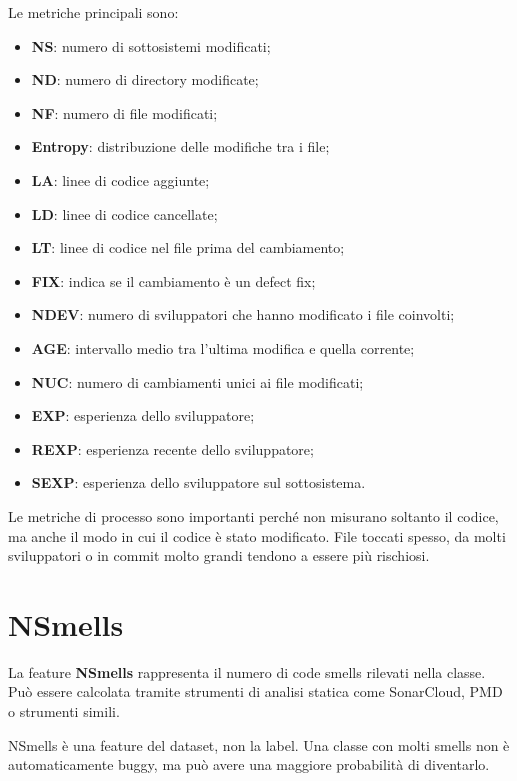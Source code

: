 Le metriche principali sono:

\begin{itemize}
    \item \textbf{NS}: numero di sottosistemi modificati;
    \item \textbf{ND}: numero di directory modificate;
    \item \textbf{NF}: numero di file modificati;
    \item \textbf{Entropy}: distribuzione delle modifiche tra i file;
    \item \textbf{LA}: linee di codice aggiunte;
    \item \textbf{LD}: linee di codice cancellate;
    \item \textbf{LT}: linee di codice nel file prima del cambiamento;
    \item \textbf{FIX}: indica se il cambiamento è un defect fix;
    \item \textbf{NDEV}: numero di sviluppatori che hanno modificato i file coinvolti;
    \item \textbf{AGE}: intervallo medio tra l'ultima modifica e quella corrente;
    \item \textbf{NUC}: numero di cambiamenti unici ai file modificati;
    \item \textbf{EXP}: esperienza dello sviluppatore;
    \item \textbf{REXP}: esperienza recente dello sviluppatore;
    \item \textbf{SEXP}: esperienza dello sviluppatore sul sottosistema.
\end{itemize}

\begin{notaprof}
Le metriche di processo sono importanti perché non misurano soltanto il codice, ma anche il modo in cui il codice è stato modificato. File toccati spesso, da molti sviluppatori o in commit molto grandi tendono a essere più rischiosi.
\end{notaprof}

\section{NSmells}

La feature \textbf{NSmells} rappresenta il numero di code smells rilevati nella classe. Può essere calcolata tramite strumenti di analisi statica come SonarCloud, PMD o strumenti simili.

\begin{notaprof}
NSmells è una feature del dataset, non la label. Una classe con molti smells non è automaticamente buggy, ma può avere una maggiore probabilità di diventarlo.
\end{notaprof}

